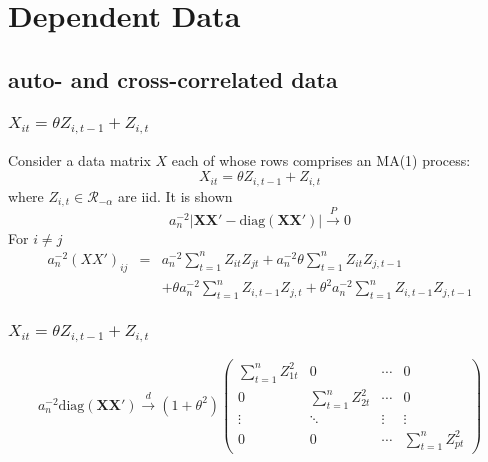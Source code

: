 \documentclass{beamer}
\renewcommand{\P}{
\mathbb P
}
\begin{document}

\section[dependent data]{Dependent Data}
\subsection{auto- and cross-correlated data}
\begin{frame}
\frametitle{$X_{it} = \theta Z_{i, t-1} + Z_{i, t}$}
Consider a data matrix $X$ each of whose rows comprises an MA(1) process:
$$
X_{it} = \theta Z_{i, t-1} + Z_{i, t}
$$
where $Z_{i,t} \in \mathcal R_{-\alpha}$ are iid. It is shown
$$
a_n^{-2} |\mathbf{XX'} - \text{diag}(\mathbf{XX'})| \overset{P}{\to} 0
$$
For $i \neq j$
\begin{eqnarray*}
  a_n^{-2}(XX')_{ij} &=& a_n^{-2} \sum_{t=1}^n Z_{it} Z_{jt} +
  a_n^{-2} \theta \sum_{t=1}^n Z_{it} Z_{j,t-1} \\
  && +\theta a_n^{-2} \sum_{t=1}^n Z_{i, t-1}
  Z_{j,t} + \theta^2 a_n^{-2} \sum_{t=1}^n Z_{i,t-1} Z_{j,t-1}
\end{eqnarray*}

\end{frame}

\begin{frame}
  \frametitle{$X_{it} = \theta Z_{i, t-1} + Z_{i, t}$}
  $$
  a_n^{-2}\text{diag}(\mathbf{XX'}) \overset{d}{\to} (1+\theta^2)
  \begin{pmatrix}
    \sum_{t=1}^n Z_{1t}^2 & 0 & \cdots & 0 \\
    0 & \sum_{t=1}^n Z_{2t}^2 & \cdots & 0 \\
    \vdots & \ddots & \vdots & \vdots \\
    0 & 0 & \cdots & \sum_{t=1}^n Z_{pt}^2
  \end{pmatrix}
  $$
\end{frame}
\end{document}
